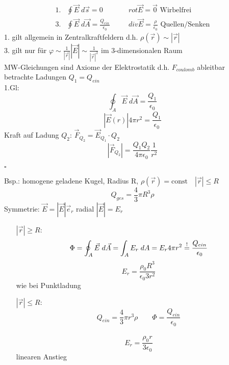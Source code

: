 \documentclass[titlepage,12pt,a4paper,ngerman]{report}
\begin{document}

$$\begin{array}{llll}
1. & \oint \vec{E}\; d\vec{s} = 0 & \quad & rot\vec{E} = \vec{0} \textrm{ Wirbelfrei } \\
3. & \oint \vec{E} \; d\vec{A} = \frac{Q_{ein}}{\epsilon_0} & \quad & div\vec{E}= \frac{\rho}{\epsilon_0}  \textrm{ Quellen/Senken} 
\end{array}$$
1. gilt allgemein in Zentralkraftfeldern d.h. $\rho(\vec{r}) \sim |\vec{r}|$\\
3. gilt nur für $\varphi \sim \frac{1}{|\vec{r}|} | \vec{E} | \sim \frac{1}{|\vec{r}|^2}$ im 3-dimensionalen Raum\\

MW-Gleichungen sind Axiome der Elektrostatik d.h. $F_{coulomb}$ ableitbar\\
betrachte Ladungen $Q_1 = Q_{ein}$\\
1.Gl: $$\oint_A \vec{E}\; d\vec{A} = \frac{Q_1}{\epsilon_0}$$
$$|\vec{E}(r)| 4 \pi r^2 = \frac{Q_1}{\epsilon_0}$$
Kraft auf Ladung $Q_2$: $\vec{F}_{Q_2} = \vec{E}_{Q_1} \cdot Q_2$
$$|\vec{F}_{Q_2}| = \frac{Q_1 Q_2}{4\pi\epsilon_0} \frac{1}{r^2}$$ 
\begin{flushright}
$\square$
\end{flushright}
Bsp.: homogene geladene Kugel, Radius R, $\rho(\vec{r}) = \textrm{const}\quad |\vec{r}| \le R$
$$ Q_{ges} = \frac{4}{3} \pi R^3 \rho$$
Symmetrie:  $ \vec{E} = |\vec{E}| \vec{e}_r$ radial $ |\vec{E}| = E_r$\\
\begin{itemize}
\item[$|\vec{r}|\ge R$:] $$\Phi = \oint_A \vec{E} \; d \vec{A} = \int_A E_r \; dA = E_r 4 \pi r^2 \buildrel ! \over = \frac{Q_{ein}}{\epsilon_0}$$
$$ E_r = \frac{\rho_0 R^3}{\epsilon_0 3 r^2}$$
wie bei Punktladung
\item[$|\vec{r}|\le R$:] $$ Q_{ein} = \frac{4}{3} \pi r^3 \rho \qquad \Phi = \frac{Q_{ein}}{\epsilon_0}$$\\
$$ E_r = \frac{\rho_0 r}{3 \epsilon_0}$$ linearen Anstieg
\end{itemize}
\end{document}
